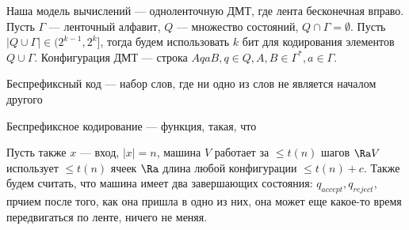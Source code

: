 \begin{reminder}
    Наша модель вычислений --- одноленточную ДМТ, где лента бесконечная вправо. Пусть \(\Gamma\) --- ленточный алфавит, \(Q\) --- множество состояний, \(Q \cap \Gamma = \emptyset\). Пусть \(|Q \cup \Gamma| \in (2^{k - 1}, 2^k]\), тогда будем использовать \(k\) бит для кодирования элементов \(Q \cup \Gamma\). Конфигурация ДМТ --- строка \(AqaB, q \in Q, A, B \in \Gamma^*, a \in \Gamma\).
\end{reminder}

\begin{definition}
    Беспрефиксный код --- набор слов, где ни одно из слов не является началом другого
\end{definition}

\begin{definition}
    Беспрефиксное кодирование --- функция, такая, что 
\end{definition}

Пусть также \(x\) --- вход, \(|x| = n\), машина \(V\) работает за \(\le t(n)\) шагов \(\Ra V\) использует \(\le t(n)\) ячеек \(\Ra \) длина любой конфигурации \(\le t(n) + c\). Также будем считать, что машина имеет два завершающих состояния: \(q_{accept}, q_{reject}\), прчием после того, как она пришла в одно из них, она может еще какое-то время передвигаться по ленте, ничего не меняя.

